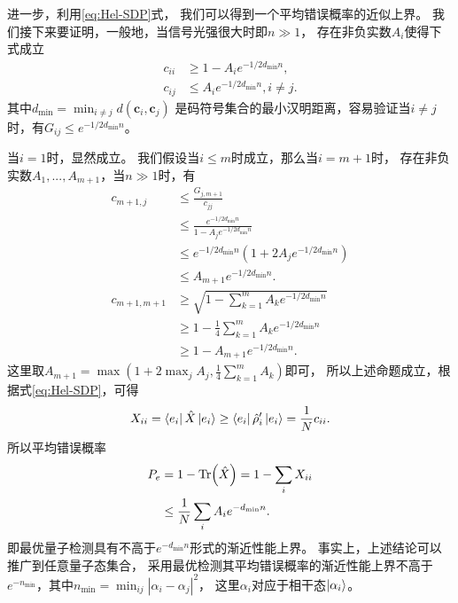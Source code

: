 进一步，利用\ref{eq:Hel-SDP}式，
我们可以得到一个平均错误概率的近似上界。
我们接下来要证明，一般地，当信号光强很大时即$n \gg 1$，
存在非负实数$A_i$使得下式成立
\begin{equation}
\begin{split}
c_{ii} & \ge 1 - A_i e^{-1/2 d_{\min} n}, \\
c_{ij} & \le A_i e^{-1/2 d_{\min} n}, i\neq j.
\end{split}
\end{equation}
其中$d_{\min} = \min_{i \neq j} d(\bm{c}_i , \bm{c}_j)$
是码符号集合的最小汉明距离，容易验证当$i \neq j$时，有$G_{ij} \le e^{-1/2 d_{\min} n}$。

当$i=1$时，显然成立。
我们假设当$i\le m$时成立，那么当$i=m+1$时，
存在非负实数$A_1, ..., A_{m+1}$，当$n \gg 1$时，有
\begin{equation}
\begin{split}
c_{m+1,j} & \le \frac{G_{j,m+1}}{c_{jj}} \\
       & \le \frac{e^{-1/2 d_{\min} n}}{1 - A_j e^{-1/2 d_{\min} n}}   \\
       & \le e^{-1/2 d_{\min} n} \left(  1 + 2 A_j e^{-1/2 d_{\min} n} \right)  \\
       & \le A_{m+1} e^{-1/2 d_{\min} n}. \\
c_{m+1,m+1} &\ge \sqrt{1 - \sum_{k=1}^{m} A_k e^{-1/2 d_{\min} n} } \\
            &\ge 1 - \frac{1}{4}\sum_{k=1}^{m} A_{k} e^{-1/2 d_{\min} n} \\
            &\ge 1 - A_{m+1} e^{-1/2 d_{\min} n}.
\end{split}
\end{equation}
这里取$A_{m+1} = \max(1+2 \max_j A_j, \frac{1}{4} \sum_{k=1}^m A_k) $即可，
所以上述命题成立，根据式\ref{eq:Hel-SDP}，可得
\begin{equation}
\begin{split}
X_{ii} = \bra{e_i} \hat{X} \ket{e_i} \ge \bra{e_i} \hat{\rho}_i' \ket{e_i} = \frac{1}{N} c_{ii}  .
\end{split}
\end{equation}
所以平均错误概率
\begin{equation}
\begin{split}
P_e &= 1 - \Tr(\hat{X}) =  1 - \sum_i X_{ii} \\
    &\le \frac{1}{N} \sum_i A_i e^{- d_{\min} n}.
\end{split}
\end{equation}
即最优量子检测具有不高于$e^{- d_{\min} n}$形式的渐近性能上界。
事实上，上述结论可以推广到任意量子态集合，
采用最优检测其平均错误概率的渐近性能上界不高于
$e^{-n_{\min}}$，其中$n_{\min} = \min_{ij} |\alpha_i - \alpha_j|^2$，
这里$\alpha_i$对应于相干态$\ket{\alpha_i}$。


